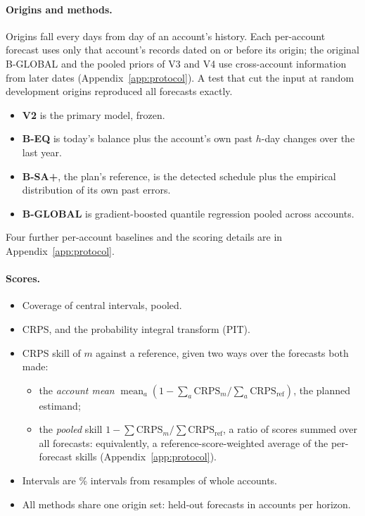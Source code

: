 \paragraph{Origins and methods.} Origins fall every  days
from day  of an account's history. Each per-account forecast
uses only that account's records dated on or before its origin; the
original B-GLOBAL and the pooled priors of V3 and V4 use cross-account
information from later dates (Appendix~\ref{app:protocol}). A test that cut the input at
 random development origins reproduced all
 forecasts exactly.
\begin{itemize}
  \item \textbf{V2} is the primary model, frozen.
  \item \textbf{B-EQ} is today's balance plus the account's own past $h$-day
  changes over the last year.
  \item \textbf{B-SA+}, the plan's reference, is the detected schedule plus the
  empirical distribution of its own past errors.
  \item \textbf{B-GLOBAL} is gradient-boosted quantile regression
  \citep{ke2017lightgbm} pooled across accounts.
\end{itemize}

Four further per-account baselines and the scoring details are in
Appendix~\ref{app:protocol}.

\paragraph{Scores.}
\begin{itemize}
  \item Coverage of central intervals, pooled.
  \item CRPS, and the probability integral transform (PIT).
  \item CRPS skill of $m$ against a reference, given two ways over the forecasts
  both made:
  \begin{itemize}
    \item the \emph{account mean}
    $\operatorname{mean}_a(1-\sum_a \mathrm{CRPS}_m/\sum_a
    \mathrm{CRPS}_{\text{ref}})$, the planned estimand;
    \item the \emph{pooled} skill $1 - \sum \mathrm{CRPS}_m / \sum
    \mathrm{CRPS}_{\text{ref}}$, a ratio of scores summed over all
    forecasts: equivalently, a reference-score-weighted average of the
    per-forecast skills (Appendix~\ref{app:protocol}).
  \end{itemize}
  \item Intervals are \% intervals from 
  resamples of whole accounts.
  \item All methods share one origin set:  held-out
  forecasts in  accounts per horizon.
\end{itemize}

